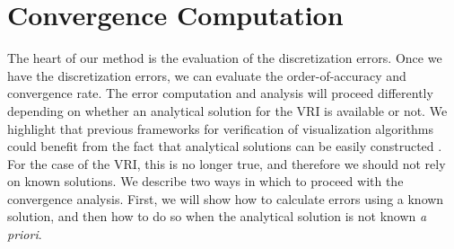 
 



\section{Convergence Computation}
\label{sec:convergence_analysis}

The heart of our method is the evaluation of the discretization
errors. Once we have the discretization errors, we can evaluate the
order-of-accuracy and convergence rate.  The error computation and
analysis will proceed differently depending on whether an analytical
solution for the VRI is available or not. We highlight that previous
frameworks for verification of visualization algorithms could benefit
from the fact that analytical solutions can be easily constructed
\cite{etiene:tvcg:2009}. For the case of the VRI, this is no longer true, and
therefore we should not rely on known solutions.  We describe
two ways in which to proceed with the convergence analysis. First, we
will show how to calculate errors using a known solution, and then how
to do so when the analytical solution is not known {\em a priori}.

